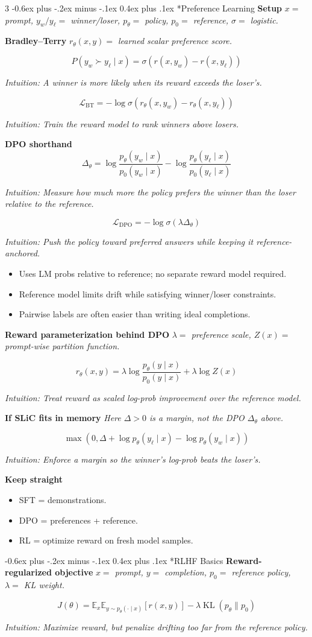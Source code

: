 \documentclass[10pt,landscape]{article}
\makeatletter
\renewcommand{\section}{\@startsection{section}{1}{0mm}%
  {-0.6ex plus -.2ex minus -.1ex}%
  {0.4ex plus .1ex}%
  {\normalfont\normalsize\bfseries}}
\newcommand{\E}{\mathbb{E}}
\newcommand{\KL}{\operatorname{KL}}
\newcommand{\head}[1]{\section*{#1}}
\newcommand{\mini}[1]{\textbf{#1}}
\newcommand{\defs}[1]{{\emph{#1}}\par}
\newcommand{\intuition}[1]{{\scriptsize\emph{Intuition: #1}\par}}
\makeatother
\begin{document}
\begin{multicols}{3}
\head{Preference Learning}
\mini{Setup}
\defs{\(x=\) prompt,\; \(y_w/y_\ell=\) winner/loser,\; \(p_\theta=\) policy,\; \(p_0=\) reference,\; \(\sigma=\) logistic.}

\mini{Bradley--Terry}
\defs{\(r_\theta(x,y)=\) learned scalar preference score.}
\[
P(y_w\succ y_\ell\mid x)=\sigma(r(x,y_w)-r(x,y_\ell))
\]
\intuition{A winner is more likely when its reward exceeds the loser's.}
\[
\mathcal L_{\mathrm{BT}}
=
-\log \sigma(r_\theta(x,y_w)-r_\theta(x,y_\ell))
\]
\intuition{Train the reward model to rank winners above losers.}

\mini{DPO shorthand}
\[
\Delta_\theta
=
\log\frac{p_\theta(y_w\mid x)}{p_0(y_w\mid x)}
-
\log\frac{p_\theta(y_\ell\mid x)}{p_0(y_\ell\mid x)}
\]
\intuition{Measure how much more the policy prefers the winner than the loser relative to the reference.}
\[
\mathcal L_{\mathrm{DPO}}=-\log \sigma(\lambda\Delta_\theta)
\]
\intuition{Push the policy toward preferred answers while keeping it reference-anchored.}
\begin{itemize}
\item Uses LM probs relative to reference; no separate reward model required.
\item Reference model limits drift while satisfying winner/loser constraints.
\item Pairwise labels are often easier than writing ideal completions.
\end{itemize}

\mini{Reward parameterization behind DPO}
\defs{\(\lambda=\) preference scale,\; \(Z(x)=\) prompt-wise partition function.}
\[
r_\theta(x,y)
=
\lambda\log\frac{p_\theta(y\mid x)}{p_0(y\mid x)}
+ \lambda\log Z(x)
\]
\intuition{Treat reward as scaled log-prob improvement over the reference model.}

\mini{If SLiC fits in memory}
\defs{Here \(\Delta>0\) is a margin, not the DPO \(\Delta_\theta\) above.}
\[
\max(0,\Delta+\log p_\theta(y_\ell\mid x)-\log p_\theta(y_w\mid x))
\]
\intuition{Enforce a margin so the winner's log-prob beats the loser's.}

\mini{Keep straight}
\begin{itemize}
\item SFT = demonstrations.
\item DPO = preferences + reference.
\item RL = optimize reward on fresh model samples.
\end{itemize}

\head{RLHF Basics}
\mini{Reward-regularized objective}
\defs{\(x=\) prompt,\; \(y=\) completion,\; \(p_0=\) reference policy,\; \(\lambda=\) KL weight.}
\[
J(\theta)
=
\E_x\E_{y\sim p_\theta(\cdot\mid x)}[r(x,y)]
-\lambda \KL(p_\theta\|p_0)
\]
\intuition{Maximize reward, but penalize drifting too far from the reference policy.}


\end{multicols}
\end{document}
